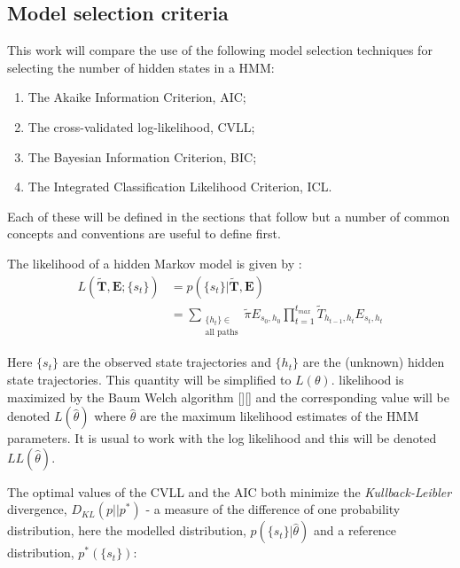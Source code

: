 \subsection{Model selection criteria}

This work will compare the use of the following model selection techniques for selecting the number of hidden states in a HMM: 
\begin{enumerate}
    \item The Akaike Information Criterion, AIC; 
    \item The cross-validated log-likelihood, CVLL; 
    \item The Bayesian Information Criterion, BIC; 
    \item The Integrated Classification Likelihood Criterion, ICL.
\end{enumerate}

Each of these will be defined in the sections that follow but a number of common concepts and conventions are useful to define first. 

The likelihood of  a hidden Markov model is given by \cite{noeProjectedHiddenMarkov2013a}: 
\begin{equation}\label{eqn:obs_lik_full}
\begin{split}
    L(\tilde{\mathbf{T}}, \mathbf{E}; \{s_t\}) & = p(\{s_t\} | \tilde{\mathbf{T}}, \mathbf{E}) \\
    & = \sum_{\substack{\{h_t\} \in \\ \text{all paths}}} \tilde{\pi}E_{s_{0}, h_{0}}\prod_{t=1}^{t_{max}}\tilde{T}_{h_{t-1}, h_t}E_{s_t, h_t}    
\end{split}
\end{equation}


Here $\{s_t\}$ are the observed state trajectories and $\{h_t\}$ are the (unknown) hidden state trajectories. This quantity will be simplified to $L(\theta)$. likelihood is maximized by the Baum Welch algorithm [][] and the corresponding value will be denoted $L(\hat{\theta})$ where $\hat{\theta}$ are the maximum likelihood estimates of the HMM parameters. It is usual to work with the log likelihood and this will be denoted $LL(\hat{\theta})$. 

The optimal values of the CVLL and the AIC both minimize the \emph{Kullback-Leibler} divergence, $D_{KL}(p||p^*)$ - a measure of the difference of one probability distribution, here the modelled distribution,  $p(\{s_t\} | \hat{\theta})$  and a reference distribution, $p^{*}(\{s_t\})$: 

